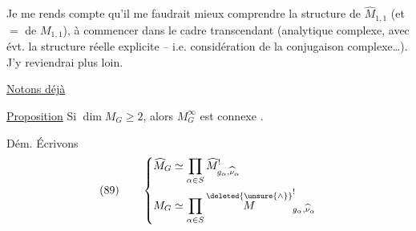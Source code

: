 Je me rends compte qu'il me faudrait mieux comprendre la structure de $\widehat M_{1,1}$ (et $=$ de $M_{1,1}$), à commencer dans le cadre transcendant (analytique complexe, avec évt. la structure réelle explicite -- i.e. considération de la conjugaison complexe\ldots). J'y reviendrai plus loin.

\uline{Notons déjà}

\uline{Proposition} Si $\dim M_G\geq2$, alors $M_G^\infty$ est  connexe .

Dém. Écrivons
\[
(89)\qquad\left\{\begin{aligned}
\widehat M_G&\simeq\prod_{\alpha\in S}\widehat M^{!}_{g_\alpha,\widehat\nu_\alpha}\\
M_G&\simeq\prod_{\alpha\in S}\overset{\deleted{\unsure{\wedge}}}{M}^{!}_{g_\alpha,\widehat\nu_\alpha}
\end{aligned}\right.
\]
